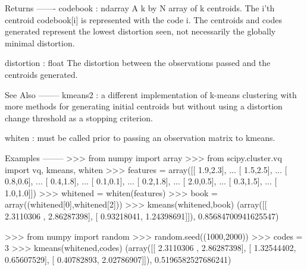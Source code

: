 \begin{DoxyVerb}
Returns
-------
codebook : ndarray
   A k by N array of k centroids. The i'th centroid
   codebook[i] is represented with the code i. The centroids
   and codes generated represent the lowest distortion seen,
   not necessarily the globally minimal distortion.

distortion : float
   The distortion between the observations passed and the
   centroids generated.

See Also
--------
kmeans2 : a different implementation of k-means clustering
   with more methods for generating initial centroids but without
   using a distortion change threshold as a stopping criterion.

whiten : must be called prior to passing an observation matrix
   to kmeans.

Examples
--------
>>> from numpy import array
>>> from scipy.cluster.vq import vq, kmeans, whiten
>>> features  = array([[ 1.9,2.3],
...                    [ 1.5,2.5],
...                    [ 0.8,0.6],
...                    [ 0.4,1.8],
...                    [ 0.1,0.1],
...                    [ 0.2,1.8],
...                    [ 2.0,0.5],
...                    [ 0.3,1.5],
...                    [ 1.0,1.0]])
>>> whitened = whiten(features)
>>> book = array((whitened[0],whitened[2]))
>>> kmeans(whitened,book)
(array([[ 2.3110306 ,  2.86287398],
       [ 0.93218041,  1.24398691]]), 0.85684700941625547)

>>> from numpy import random
>>> random.seed((1000,2000))
>>> codes = 3
>>> kmeans(whitened,codes)
(array([[ 2.3110306 ,  2.86287398],
       [ 1.32544402,  0.65607529],
       [ 0.40782893,  2.02786907]]), 0.5196582527686241)\end{DoxyVerb}
 \hypertarget{namespacescipy_1_1cluster_1_1vq_a714311c102593f06182b0fa9f187b20f}{}
